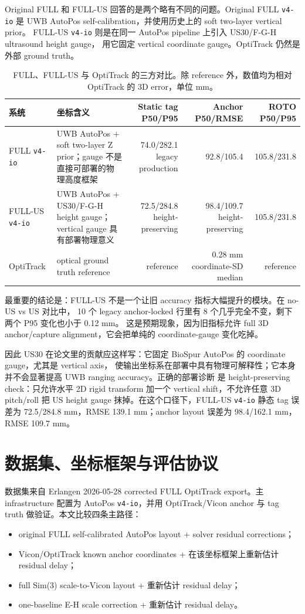 \documentclass[UTF8,11pt,a4paper]{ctexart}
\newcommand{\case}[1]{\texttt{#1}}
\newcommand{\tight}{\setlength{\tabcolsep}{4pt}\renewcommand{\arraystretch}{1.12}}
\begin{document}
Original FULL 和 FULL-US 回答的是两个略有不同的问题。Original FULL \case{v4-io}
是 UWB AutoPos self-calibration，并使用历史上的 soft two-layer vertical prior。
FULL-US \case{v4-io} 则是在同一 AutoPos pipeline 上引入 US30/F-G-H ultrasound height gauge，
用它固定 vertical coordinate gauge。OptiTrack 仍然是外部 ground truth。

\begin{table}[H]
\centering
\tight
\caption{FULL、FULL-US 与 OptiTrack 的三方对比。除 reference 外，数值均为相对 OptiTrack 的 3D error，单位 mm。}
\begin{tabularx}{\textwidth}{lXrrr}
\toprule
系统 & 坐标含义 & Static tag P50/P95 & Anchor P50/RMSE & ROTO P50/P95 \\
\midrule
FULL \case{v4-io} & UWB AutoPos + soft two-layer Z prior；gauge 不是直接可部署的物理高度框架 & 74.0/282.1 legacy production & 92.8/105.4 & 105.8/231.8 \\
FULL-US \case{v4-io} & UWB AutoPos + US30/F-G-H height gauge；vertical gauge 具有部署物理意义 & 72.5/284.8 height-preserving & 98.4/109.7 height-preserving & 105.8/231.8 \\
OptiTrack & optical ground truth reference & reference & 0.28 mm coordinate-SD median & reference \\
\bottomrule
\end{tabularx}
\end{table}

最重要的结论是：FULL-US 不是一个让旧 accuracy 指标大幅提升的模块。在 no-US vs US 对比中，
10 个 legacy anchor-locked 行里有 8 个几乎完全不变，剩下两个 P95 变化也小于 0.12 mm。
这是预期现象，因为旧指标允许 full 3D anchor/capture alignment，它会把单纯的 coordinate-gauge
变化吃掉。

因此 US30 在论文里的贡献应这样写：它固定 BioSpur AutoPos 的 coordinate gauge，尤其是 vertical axis，
使输出坐标系在部署中具有物理可解释性；它本身并不会显著提高 UWB ranging accuracy。正确的部署诊断
是 height-preserving check：只允许水平 2D rigid transform 加一个 vertical shift，不允许任意 3D
pitch/roll 把 US height gauge 抹掉。在这个口径下，FULL-US \case{v4-io} 静态 tag 误差为
72.5/284.8 mm，RMSE 139.1 mm；anchor layout 误差为 98.4/162.1 mm，RMSE 109.7 mm。

\section{数据集、坐标框架与评估协议}

数据集来自 Erlangen 2026-05-28 corrected FULL OptiTrack export。主 infrastructure
配置为 AutoPos \case{v4-io}，并用 OptiTrack/Vicon anchor 与 tag truth 做验证。本文比较四条主路径：
\begin{itemize}
    \item original FULL self-calibrated AutoPos layout + solver residual corrections；
    \item Vicon/OptiTrack known anchor coordinates + 在该坐标框架上重新估计 residual delay；
    \item full Sim(3) scale-to-Vicon layout + 重新估计 residual delay；
    \item one-baseline E-H scale correction + 重新估计 residual delay。
\end{itemize}
\end{document}

